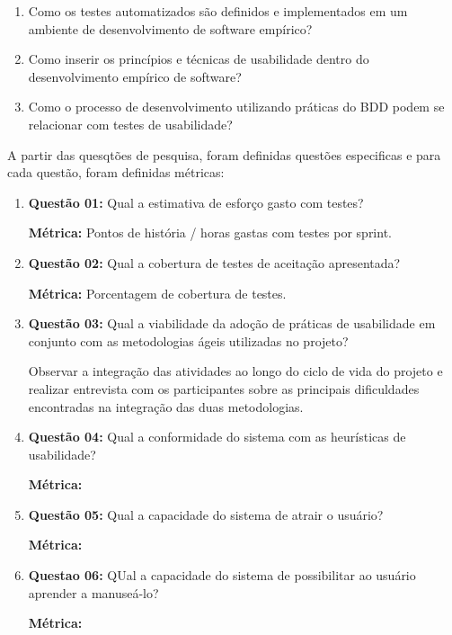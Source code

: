 \begin{enumerate}
\item Como os testes automatizados são definidos e implementados em um ambiente de desenvolvimento de software empírico?
\item Como inserir os princípios e técnicas de usabilidade dentro do desenvolvimento empírico de software?
\item Como o processo de desenvolvimento utilizando práticas do BDD podem se relacionar com testes de usabilidade?
\end{enumerate}

A partir das quesqtões de pesquisa, foram definidas questões especificas e para cada questão, foram definidas métricas:



\begin{enumerate}
\item \textbf{Questão 01: }Qual a estimativa de esforço gasto com testes?

	\textbf{Métrica: } Pontos de história / horas gastas com testes por sprint.

\item \textbf{Questão 02: }Qual a cobertura de testes de aceitação apresentada?

	\textbf{Métrica: } Porcentagem de cobertura de testes.

\item \textbf{Questão 03: }Qual a viabilidade da adoção de práticas de usabilidade em conjunto com as metodologias ágeis utilizadas no projeto?

	Observar a integração das atividades ao longo do ciclo de vida do projeto e realizar entrevista com os participantes sobre as principais dificuldades encontradas na integração das duas metodologias.
\item \textbf{Questão 04: }Qual a conformidade do sistema com as heurísticas de usabilidade?

	\textbf{Métrica: }
\item \textbf{Questão 05: }Qual a capacidade do sistema de atrair o usuário?
	
	\textbf{Métrica: }
\item \textbf{Questao 06:} QUal a capacidade do sistema de possibilitar ao usuário aprender a manuseá-lo?

	\textbf{Métrica: }
\end{enumerate}


